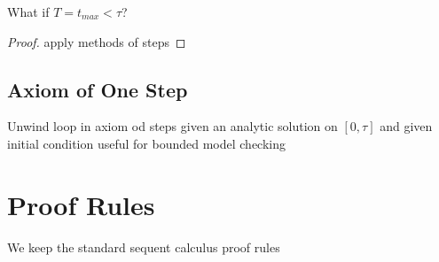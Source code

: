 \documentclass[10pt]{report}
\begin{document}
            \begin{calculus}


            \end{calculus}

            What if $T=t_{max} < \tau$?

            \begin{proof}
                apply methods of steps
            \end{proof}

        \subsection{Axiom of One Step}
            \label{sex:axiom-of-one-step}

            Unwind loop in axiom od steps
            given an analytic solution on $[0,\tau]$ and given initial condition
            useful for bounded model checking

    \section{Proof Rules}
        \label{sec:proof-rules}

        We keep the standard sequent calculus proof rules
\end{document}
